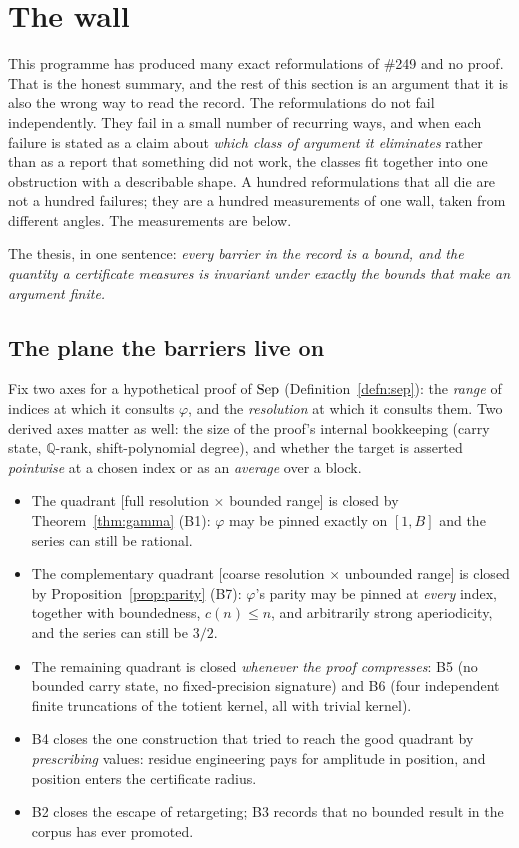 \documentclass[11pt]{article}
\theoremstyle{breakplain}
\theoremstyle{breakdefinition}
\theoremstyle{breakdefinition}
\let\origmathrm\mathrm
\renewcommand{\mathrm}[1]{\ifmmode\origmathrm{#1}\else\textrm{#1}\fi}%
\newcommand{\Q}{\mathbb{Q}}
\begin{document}
\section{The wall}
\label{sec:wall}

This programme has produced many exact reformulations of \#249 and no proof.
That is the honest summary, and the rest of this section is an argument that
it is also the wrong way to read the record. The reformulations do not fail
independently. They fail in a small number of recurring ways, and when each
failure is stated as a claim about \emph{which class of argument it
eliminates} rather than as a report that something did not work, the classes
fit together into one obstruction with a describable shape. A hundred
reformulations that all die are not a hundred failures; they are a hundred
measurements of one wall, taken from different angles. The measurements are
below.

The thesis, in one sentence: \emph{every barrier in the record is a bound, and
the quantity a certificate measures is invariant under exactly the bounds that
make an argument finite.}

\subsection{The plane the barriers live on}

Fix two axes for a hypothetical proof of $\mathrm{Sep}$
(Definition~\ref{defn:sep}): the \emph{range} of indices at which it consults
$\varphi$, and the \emph{resolution} at which it consults them. Two derived
axes matter as well: the size of the proof's internal bookkeeping (carry
state, $\Q$-rank, shift-polynomial degree), and whether the target is asserted
\emph{pointwise} at a chosen index or as an \emph{average} over a block.

\begin{itemize}[leftmargin=*]
\item The quadrant [full resolution $\times$ bounded range] is closed by
  Theorem~\ref{thm:gamma} (B1): $\varphi$ may be pinned exactly on $[1,B]$ and
  the series can still be rational.
\item The complementary quadrant [coarse resolution $\times$ unbounded range]
  is closed by Proposition~\ref{prop:parity} (B7): $\varphi$'s parity may be
  pinned at \emph{every} index, together with boundedness, $c(n) \le n$, and
  arbitrarily strong aperiodicity, and the series can still be $3/2$.
\item The remaining quadrant is closed \emph{whenever the proof compresses}:
  B5 (no bounded carry state, no fixed-precision signature) and B6 (four
  independent finite truncations of the totient kernel, all with trivial
  kernel).
\item B4 closes the one construction that tried to reach the good quadrant by
  \emph{prescribing} values: residue engineering pays for amplitude in
  position, and position enters the certificate radius.
\item B2 closes the escape of retargeting; B3 records that no bounded result
  in the corpus has ever promoted.
\end{itemize}
\end{document}
